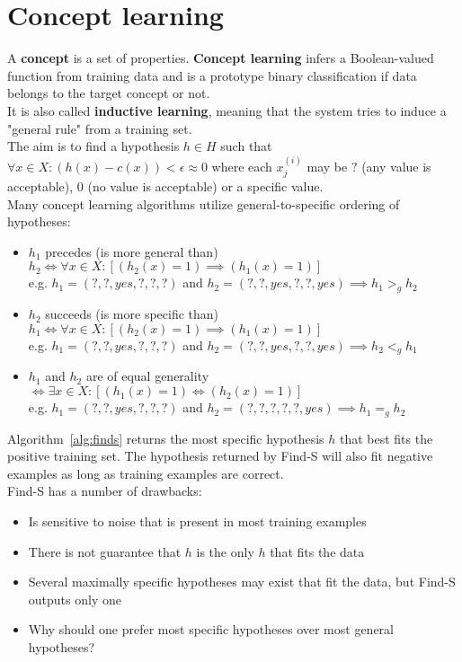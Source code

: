 \documentclass{report}
\begin{document}
\section{Concept learning}
A {\bf concept} is a set of properties.
{\bf Concept learning} infers a Boolean-valued function from training data and is a prototype binary classification if data belongs to the target concept or not.
\\
It is also called {\bf inductive learning}, meaning that the system tries to induce a "general rule" from a training set.
\\
The aim is to find a hypothesis $h\in H$ such that $\forall x\in X: (h(x) - c(x)) < \epsilon \approx 0$ where each $x^{(i)}_j$ may be $?$ (any value is acceptable), $0$ (no value is acceptable) or a specific value.
\\
Many concept learning algorithms utilize general-to-specific ordering of hypotheses:
\begin{itemize}
\item $h_1$ precedes (is more general than) $h_2 \iff \forall x\in X: [(h_2(x)=1)\implies (h_1(x)=1)]$ \\
e.g. $h_1 = (?,?,yes,?,?,?)$ and $h_2 = (?,?,yes,?,?,yes) \implies h_1 >_g h_2$
\item $h_2$ succeeds (is more specific than) $h_1 \iff \forall x\in X: [(h_2(x)=1)\implies (h_1(x)=1)]$ \\
e.g. $h_1 = (?,?,yes,?,?,?)$ and $h_2 = (?,?,yes,?,?,yes)  \implies h_2 <_g h_1$
\item $h_1$ and $h_2$ are of equal generality $\iff \exists x\in X: [(h_1(x)=1)\iff (h_2(x)=1)]$ \\
e.g. $h_1 = (?,?,yes,?,?,?)$ and $h_2 = (?,?,?,?,?,yes) \implies h_1 =_g h_2$
\end{itemize}

Algorithm~\ref{alg:finds} returns the most specific hypothesis $h$ that best fits the positive training set. The hypothesis returned by Find-S will also fit negative examples as long as training examples are correct.
\\
Find-S has a number of drawbacks:
\begin{itemize}
\item Is sensitive to noise that is present in most training examples
\item There is not guarantee that $h$ is the only $h$ that fits the data
\item Several maximally specific hypotheses may exist that fit the data, but Find-S outputs only one
\item Why should one prefer most specific hypotheses over most general hypotheses?
\end{itemize}
\end{document}

